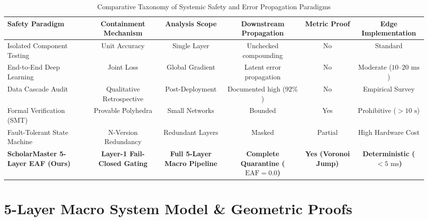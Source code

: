 \documentclass[conference]{IEEEtran}
\begin{document}
\begin{table}[t]
\centering
\caption{Comparative Taxonomy of Systemic Safety and Error Propagation Paradigms}
\label{tab:macro_taxonomy}
\begin{tabular}{@{}lccccc@{}}
\toprule
\textbf{Safety Paradigm} & \textbf{Containment Mechanism} & \textbf{Analysis Scope} & \textbf{Downstream Propagation} & \textbf{Metric Proof} & \textbf{Edge Implementation} \\ \midrule
Isolated Component Testing \cite{he2016deep} & Unit Accuracy & Single Layer & Unchecked compounding & No & Standard \\
End-to-End Deep Learning \cite{vaswani2017attention} & Joint Loss & Global Gradient & Latent error propagation & No & Moderate ($10\text{--}20\text{ ms}$) \\
Data Cascade Audit \cite{sambasivan2021everyone} & Qualitative Retrospective & Post-Deployment & Documented high ($92\%$) & No & Empirical Survey \\
Formal Verification (SMT) \cite{katz2017reluplex} & Provable Polyhedra & Small Networks & Bounded & Yes & Prohibitive ($>10\text{ s}$) \\
Fault-Tolerant State Machine \cite{avizienis2004basic} & N-Version Redundancy & Redundant Layers & Masked & Partial & High Hardware Cost \\
\textbf{ScholarMaster 5-Layer EAF (Ours)} & \textbf{Layer-1 Fail-Closed Gating} & \textbf{Full 5-Layer Macro Pipeline} & \textbf{Complete Quarantine ($\text{EAF}=0.0$)} & \textbf{Yes (Voronoi Jump)} & \textbf{Deterministic ($<5\text{ ms}$)} \\ \bottomrule
\end{tabular}
\end{table}

\section{5-Layer Macro System Model \& Geometric Proofs}
\end{document}
